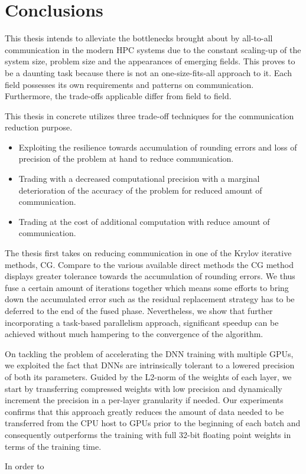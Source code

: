 \chapter{Conclusions}
\label{chap:conclusions}
This thesis intends to alleviate the bottlenecks brought about by all-to-all 
communication in the modern HPC systems due to the constant scaling-up of the 
system size, problem size and the appearances of emerging fields.
This proves to be a daunting task because there is not an one-size-fits-all 
approach to it. Each field possesses its own requirements and patterns on 
communication. Furthermore, the trade-offs applicable differ from field to 
field.

This thesis in concrete utilizes three trade-off techniques for the communication 
reduction purpose.
\begin{itemize}
    \item Exploiting the resilience towards accumulation of rounding errors and 
        loss of precision of the problem at hand to reduce communication.
    \item Trading with a decreased computational precision with a marginal 
        deterioration of the accuracy of the problem for reduced amount of 
        communication. 
    \item Trading at the cost of additional computation with reduce amount of 
        communication.
\end{itemize}

The thesis first takes on reducing communication in one of the Krylov iterative 
methods, CG. Compare to the various available direct methods the CG method 
displays greater tolerance towards the accumulation of rounding errors. We thus 
fuse a certain amount of iterations together which means some efforts to bring 
down the accumulated error such as the residual replacement strategy has to be 
deferred to the end of the fused phase. Nevertheless, we show that further 
incorporating a task-based parallelism approach, significant speedup can be 
achieved without much hampering to the convergence of the algorithm.

On tackling the problem of accelerating the DNN training with multiple GPUs, we 
exploited the fact that DNNs are intrinsically tolerant to a lowered precision 
of both its parameters. Guided by the L2-norm of the weights of each layer, we 
start by transferring compressed weights with low precision and dynamically 
increment the precision in a per-layer granularity if needed.
Our experiments confirms that this approach greatly reduces the amount of data
needed to be transferred from the CPU host to GPUs prior to the beginning of 
each batch and consequently outperforms the training with full 32-bit floating 
point weights in terms of the training time.

In order to 

